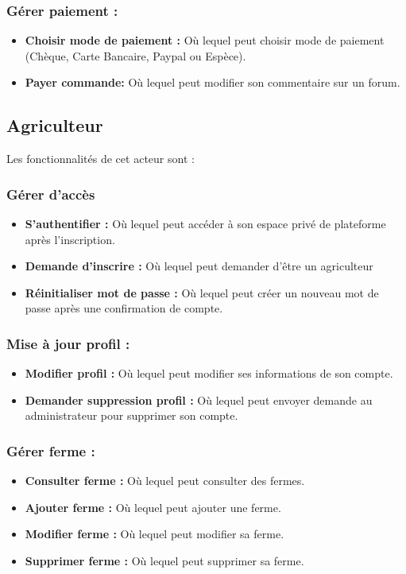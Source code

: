 \documentclass[16pt,fleqn]{article} %
\begin{document}
\subsubsection{Gérer paiement :}
    \begin{itemize}
        \item \textbf{Choisir mode de paiement :} Où lequel peut choisir mode de paiement (Chèque, Carte Bancaire, Paypal ou Espèce).
        \item \textbf{Payer commande:} Où lequel peut modifier son commentaire sur un forum.
    \end{itemize}
    
\subsection{Agriculteur}
Les fonctionnalités de cet acteur sont :
\subsubsection{Gérer d'accès}
\begin{itemize}
    \item \textbf{S'authentifier :} Où lequel peut accéder à son espace privé de plateforme après l'inscription.
    \item \textbf{Demande d'inscrire :} Où lequel peut demander d'être un agriculteur
    \item \textbf{Réinitialiser mot de passe :} Où lequel peut créer un nouveau mot de passe après une confirmation de compte.
\end{itemize}
\subsubsection{Mise à jour profil :}
\begin{itemize}
    \item \textbf{Modifier profil :} Où lequel peut modifier ses informations de son compte.
    \item \textbf{Demander suppression profil :} Où lequel peut envoyer demande au administrateur pour supprimer son compte.
\end{itemize}

\subsubsection{Gérer ferme :}
\begin{itemize}
    \item \textbf{Consulter ferme :} Où lequel peut consulter des fermes.
    \item \textbf{Ajouter ferme :} Où lequel peut ajouter une ferme.
    \item \textbf{Modifier ferme :} Où lequel peut modifier sa ferme.
    \item \textbf{Supprimer ferme :} Où lequel peut supprimer sa ferme.
\end{itemize}
\end{document}
